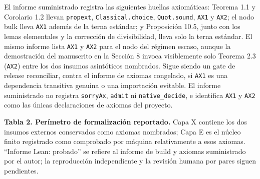 \documentclass[
  11pt,
]{article}
\begin{document}
El informe suministrado registra las siguientes huellas axiomáticas:
Teorema 1.1 y Corolario 1.2 llevan \texttt{propext},
\texttt{Classical.choice}, \texttt{Quot.sound}, \texttt{AX1} y
\texttt{AX2}; el nodo bulk lleva \texttt{AX1} además de la terna
estándar; y Proposición 10.5, junto con los lemas elementales y la
corrección de divisibilidad, lleva solo la terna estándar. El mismo
informe lista \texttt{AX1} y \texttt{AX2} para el nodo del régimen
escaso, aunque la demostración del manuscrito en la Sección 8 invoca
visiblemente solo Teorema 2.3 (\texttt{AX2}) entre los dos insumos
asintóticos nombrados. Sigue siendo un gate de release reconciliar,
contra el informe de axiomas congelado, si \texttt{AX1} es una
dependencia transitiva genuina o una importación evitable. El informe
suministrado no registra \texttt{sorryAx}, \texttt{admit} ni
\texttt{native\_decide}, e identifica \texttt{AX1} y \texttt{AX2} como
las únicas declaraciones de axiomas del proyecto.

\textbf{Tabla 2. Perímetro de formalización reportado.} Capa X contiene
los dos insumos externos conservados como axiomas nombrados; Capa E es
el núcleo finito registrado como comprobado por máquina relativamente a
esos axiomas. ``Informe Lean: probado'' se refiere al informe de build y
axiomas suministrado por el autor; la reproducción independiente y la
revisión humana por pares siguen pendientes.
\end{document}
